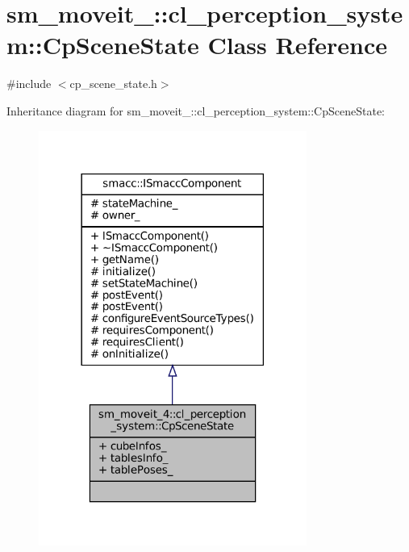 \hypertarget{classsm__moveit__4_1_1cl__perception__system_1_1CpSceneState}{}\section{sm\+\_\+moveit\+\_\+:\+:cl\+\_\+perception\+\_\+system\+:\+:Cp\+Scene\+State Class Reference}
\label{classsm__moveit__4_1_1cl__perception__system_1_1CpSceneState}


{\ttfamily \#include $<$cp\+\_\+scene\+\_\+state.\+h$>$}



Inheritance diagram for sm\+\_\+moveit\+\_\+:\+:cl\+\_\+perception\+\_\+system\+:\+:Cp\+Scene\+State\+:
\nopagebreak
\begin{figure}[H]
\begin{center}
\leavevmode
\includegraphics[width=249pt]{classsm__moveit__4_1_1cl__perception__system_1_1CpSceneState__inherit__graph}
\end{center}
\end{figure}


